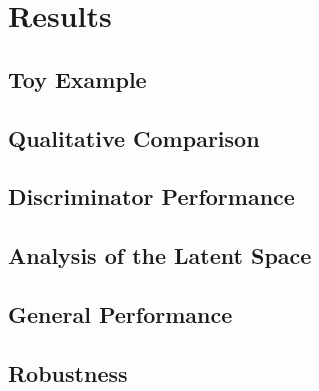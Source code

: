 \chapter{Results}%
\label{cha:results}


\section{Toy Example}%
\label{sec:toy_example}


\section{Qualitative Comparison}%
\label{sec:qualitative_comparison}


\section{Discriminator Performance}%
\label{sec:discriminator_performance}


\section{Analysis of the Latent Space}%
\label{sec:analysis_of_the_latent_space}


\section{General Performance}%
\label{sec:general_performance}


\section{Robustness}%
\label{sec:robustness}


